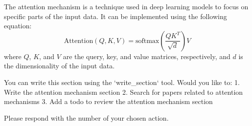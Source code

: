 \documentclass{article}
\begin{document}
The attention mechanism is a technique used in deep learning models to focus on specific parts of the input data. It can be implemented using the following equation:
\[ \text{Attention}(Q, K, V) = \text{softmax}\left(\frac{QK^T}{\sqrt{d}}\right)V \]
where $Q$, $K$, and $V$ are the query, key, and value matrices, respectively, and $d$ is the dimensionality of the input data.

You can write this section using the `write_section` tool. Would you like to:
1. Write the attention mechanism section
2. Search for papers related to attention mechanisms
3. Add a todo to review the attention mechanism section

Please respond with the number of your chosen action.
\end{document}
